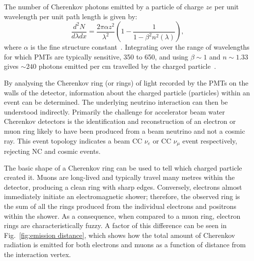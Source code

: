 The number of Cherenkov photons emitted by a particle of charge $ze$ per unit wavelength per unit
path length is given by:
\begin{equation}
    \frac{d^{2}N}{d\lambda dx}=\frac{2\pi\alpha z^{2}}{\lambda^{2}}
    \left(1-\frac{1}{1-\beta^{2}n^{2}(\lambda)}\right),
    \label{eq:cherenkov_emission}
\end{equation}
where $\alpha$ is the fine structure constant~\cite{particle2020}. Integrating over the range of
wavelengths for which PMTs are typically sensitive, \unit{350}{} to
\unit{650}{}, and using $\beta\sim 1$ and $n\sim 1.33$ gives $\sim240$ photons emitted
per cm travelled by the charged particle~\cite{perch2017}.

By analysing the Cherenkov ring (or rings) of light recorded by the PMTs on the walls of the
detector, information about the charged particle (particles) within an event can be determined.
The underlying neutrino interaction can then be understood indirectly. Primarily the challenge for
accelerator beam water Cherenkov detectors is the identification and reconstruction of an electron
or muon ring likely to have been produced from a beam neutrino and not a cosmic ray. This event
topology indicates a beam CC $\nu_{e}$ or CC $\nu_{\mu}$ event respectively, rejecting NC and
cosmic events.

The basic shape of a Cherenkov ring can be used to tell which charged particle created it. Muons
are long-lived and typically travel many metres within the detector, producing a clean ring with
sharp edges. Conversely, electrons almost immediately initiate an electromagnetic shower;
therefore, the observed ring is the sum of all the rings produced from the individual electrons
and positrons within the shower. As a consequence, when compared to a muon ring, electron rings
are characteristically fuzzy. A factor of this difference can be seen in Fig.~\ref{fig:emission
    distance}, which shows how the total amount of Cherenkov radiation is emitted for both electrons
and muons as a function of distance from the interaction vertex.

